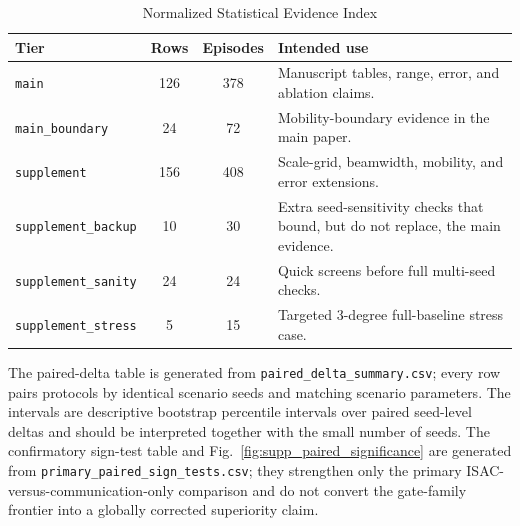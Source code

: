 \documentclass[journal]{IEEEtran}
\begin{document}
\begin{table}[!t]
  \centering
  \caption{Normalized Statistical Evidence Index}
  \label{tab:supp_stats_index}
  \scriptsize
  \begin{tabular}{p{}ccp{}}
    \toprule
    Tier & Rows & Episodes & Intended use \\
    \midrule
    \texttt{main} & 126 & 378 & Manuscript tables, range, error, and ablation claims. \\
    \texttt{main\_boundary} & 24 & 72 & Mobility-boundary evidence in the main paper. \\
    \texttt{supplement} & 156 & 408 & Scale-grid, beamwidth, mobility, and error extensions. \\
    \texttt{supplement\_backup} & 10 & 30 & Extra seed-sensitivity checks that bound, but do not replace, the main evidence. \\
    \texttt{supplement\_sanity} & 24 & 24 & Quick screens before full multi-seed checks. \\
    \texttt{supplement\_stress} & 5 & 15 & Targeted 3-degree full-baseline stress case. \\
    \bottomrule
  \end{tabular}
\end{table}

The paired-delta table is generated from \texttt{paired\_delta\_summary.csv}; every row pairs protocols by identical scenario seeds and matching scenario parameters.
The intervals are descriptive bootstrap percentile intervals over paired seed-level deltas and should be interpreted together with the small number of seeds.
The confirmatory sign-test table and Fig.~\ref{fig:supp_paired_significance} are generated from \texttt{primary\_paired\_sign\_tests.csv}; they strengthen only the primary ISAC-versus-communication-only comparison and do not convert the gate-family frontier into a globally corrected superiority claim.
\end{document}
